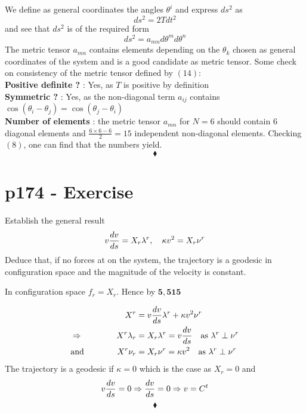 We define as general coordinates the angles $\theta^i$
and express $ds^2$ as 
$$ds^2= 2Tdt^2$$ 
and see that $ds^2$ is of the required form 
$$ds^2= a_{mn}d\theta^md\theta^n$$
The metric tensor $a_{mn}$ contains elements depending on the $\theta_k$ chosen as general coordinates of the system and is a good candidate as metric tensor.
Some check on consistency of the metric tensor defined by $(14)$:\\
\textbf{Positive definite ?} : Yes, as $T$ is positive by definition\\
\textbf{Symmetric ?} : Yes, as the non-diagonal term $a_{ij}$ contains $\cos\left(\theta_i-\theta_j\right) = \cos\left(\theta_j-\theta_i\right)$ \\
\textbf{Number of elements} : the metric tensor $a_{mn}$ for $N=6$ should contain $6$ diagonal elements and $\frac{6\times 6 -6}{2} = 15$ independent non-diagonal elements. Checking $(8)$, one can find that the numbers yield.
$$\blacklozenge$$
\newpage



\section{p174 - Exercise}
\begin{tcolorbox}
Establish the general result
$$v\dv{v}{s}=X_r\lambda^r, \quad \kappa v^2=X_r\nu^r$$
Deduce that, if no forces at on the system, the trajectory is a geodesic in configuration space and the magnitude of the velocity is constant.
\end{tcolorbox}
In configuration space $f_r=X_r$. Hence by $\mathbf{5,515}$

\begin{align}
X^r&=v\dv{v}{s}\lambda^r+\kappa v^2\nu^r\\
\Rightarrow \quad\quad\quad\quad X^r \lambda_r &=X_r\lambda^r = v\dv{v}{s} \quad \text{as } \lambda^r \perp \nu^r\\
\text{and} \quad\quad\quad\quad X^r \nu_r &=X_r\nu^r = \kappa v^2\quad \text{as } \lambda^r \perp \nu^r\\
\end{align}
The trajectory is a geodesic if $\kappa = 0$ which is the case as $X_r=0$ and $$v\dv{v}{s} =0 \Rightarrow \dv{v}{s} =0 \Rightarrow v= C^{t}$$
$$\blacklozenge$$
\newpage


